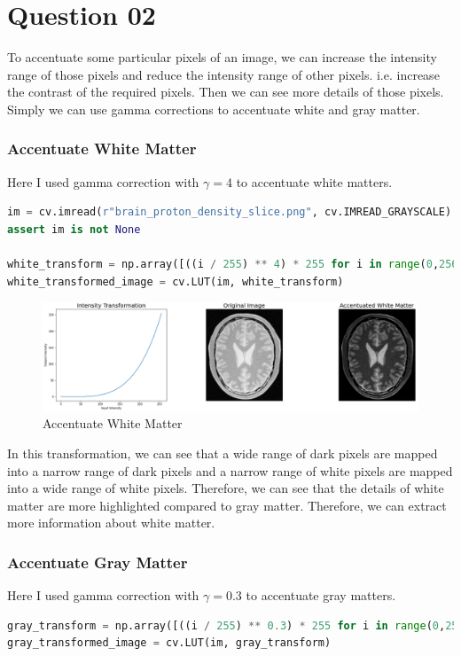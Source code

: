 \documentclass[a4paper]{article}
\begin{document}
\section*{Question 02}
To accentuate some particular pixels of an image, we can increase the
 intensity range of those pixels and reduce the intensity range of other
  pixels. i.e. increase the contrast of the required pixels. Then we can
   see more details of those pixels. Simply we can use gamma corrections
    to accentuate white and gray matter.
\subsubsection*{Accentuate White Matter}
Here I used gamma correction with $\gamma = 4$ to accentuate white matters.
\begin{lstlisting}[language=python, caption=Accentuate White Matter, label=q2c]
im = cv.imread(r"brain_proton_density_slice.png", cv.IMREAD_GRAYSCALE)
assert im is not None

white_transform = np.array([((i / 255) ** 4) * 255 for i in range(0,256)],dtype=np.uint8)
white_transformed_image = cv.LUT(im, white_transform)
    \end{lstlisting}
\begin{figure}[!htb]
    \centering

    \includegraphics[width=\textwidth]{../q2.png}
    \caption{Accentuate White Matter}
    \label{figq2}
\end{figure}
In this transformation, we can see that a wide range of dark pixels
 are mapped into a narrow range of dark pixels and a narrow range of
  white pixels are mapped into a wide range of white pixels. Therefore,
   we can see that the details of white matter are more highlighted
    compared to gray matter. Therefore, we can extract more information about
     white matter.
\subsubsection*{Accentuate Gray Matter}
Here I used gamma correction with $\gamma = 0.3$ to accentuate gray matters.
\begin{lstlisting}[language=python, caption=Accentuate Gray Matter, label=q22c]
gray_transform = np.array([((i / 255) ** 0.3) * 255 for i in range(0,256)],dtype=np.uint8)
gray_transformed_image = cv.LUT(im, gray_transform)
\end{lstlisting}
\end{document}
